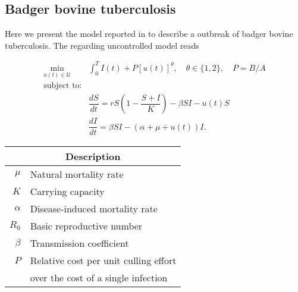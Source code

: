 \subsection*{Badger bovine tuberculosis}
Here we present the model reported in \cite*{Bolzoni2014} to describe a 
outbreak of badger bovine tuberculosis. The regarding 
uncontrolled model reads

\begin{equation}
	\begin{aligned}
  \min_{u(t)\in \mathcal{U}}
    &
    \int_0^T
      I(t) + P [u(t)]^{\theta}, \quad \theta \in \{1,2\},
      \quad P = B/A
  \\ \textrm{subject to:} &
  \\
    &\dfrac{dS}{dt} =
			r S 
			\left (
				1 - \dfrac{S+I}{K}
			\right)
			 - \beta SI - u(t) S
		\\
		&\dfrac{dI}{dt} =
			\beta SI - (\alpha + \mu + u(t)) I.
	\end{aligned}
\end{equation}
%
\begin{table}
  \begin{center}
    \begin{tabular}{@{}rl@{}}
        \toprule
      \multicolumn{2}{c}{\bf{Description}}
      \\
      \midrule
      $\mu$
        & Natural mortality rate
      \\
      $K$
        & Carrying capacity
      \\
      $\alpha$
        & Disease-induced mortality rate
      \\
      $R_0$
        & Basic reproductive number
      \\
      $\beta$
        & Transmission coefficient
      \\
      $P$
        & Relative cost per unit culling effort \\
        & over the cost of a single infection
      \\
      \bottomrule
    \end{tabular}
  \end{center}
\end{table}